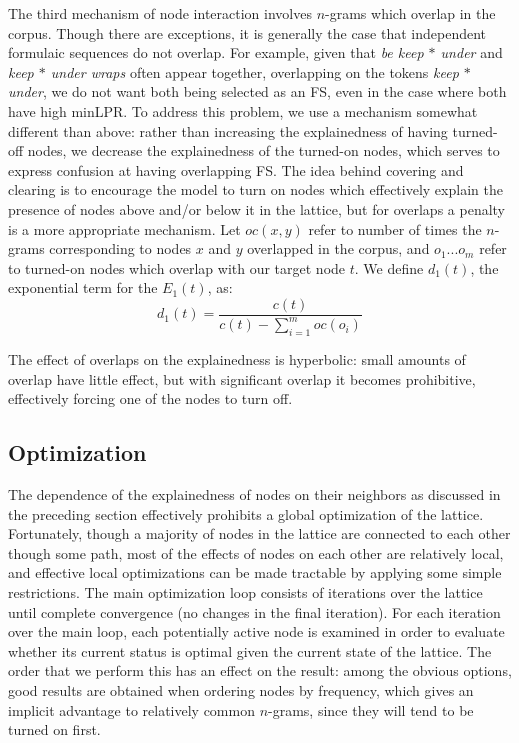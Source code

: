 \documentclass[11pt,letterpaper]{article}
\newcommand{\dotts}{...}
\newcommand{\gap}{$*$\xspace}
\newcommand{\ex}[1]{\textit{#1}\xspace}
\begin{document}
The third mechanism of node interaction involves $n$-grams which overlap in the corpus. Though there are exceptions, it is generally the case that independent formulaic sequences do not overlap. For example, given that \ex{be keep \gap under} and \ex{keep \gap under wraps} often appear together, overlapping on the tokens \ex{keep \gap under}, we do not want both being selected as an FS, even in the case where both have high minLPR. To address this problem, we use a mechanism somewhat different than above: rather than increasing the explainedness of having turned-off nodes, we decrease the explainedness of the turned-on nodes, which serves to express confusion at having overlapping FS. The idea behind covering and clearing is to encourage the model to turn on nodes which effectively explain the presence of nodes above and/or below it in the lattice, but for overlaps a penalty is a more appropriate mechanism. Let $oc(x,y)$ refer to number of times the $n$-grams corresponding to nodes $x$ and $y$ overlapped in the corpus, and $o_1\dotts o_m$ refer to turned-on nodes which overlap with our target node $t$. We define $d_1(t)$, the exponential term for the $E_1(t)$, as:
\begin{displaymath}
d_{1}(t) = \frac{c(t)}{c(t) - \sum_{i=1}^{m}{oc(o_i)}}
\end{displaymath}

The effect of overlaps on the explainedness is hyperbolic: small amounts of overlap have little effect, but with significant overlap it becomes prohibitive, effectively forcing one of the nodes to turn off. 

 
\subsection{Optimization}

The dependence of the explainedness of nodes on their neighbors as discussed in the preceding section effectively prohibits a global optimization of the lattice. Fortunately, though a majority of nodes in the lattice are connected to each other though some path, most of the effects of nodes on each other are relatively local, and effective local optimizations can be made tractable by applying some simple restrictions. The main optimization loop consists of iterations over the lattice until complete convergence (no changes in the final iteration). For each iteration over the main loop, each potentially active node is examined in order to evaluate whether its current status is optimal given the current state of the lattice. The order that we perform this has an effect on the result: among the obvious options, good results are obtained when ordering nodes by frequency, which gives an implicit advantage to relatively common $n$-grams, since they will tend to be turned on first.
\end{document}
